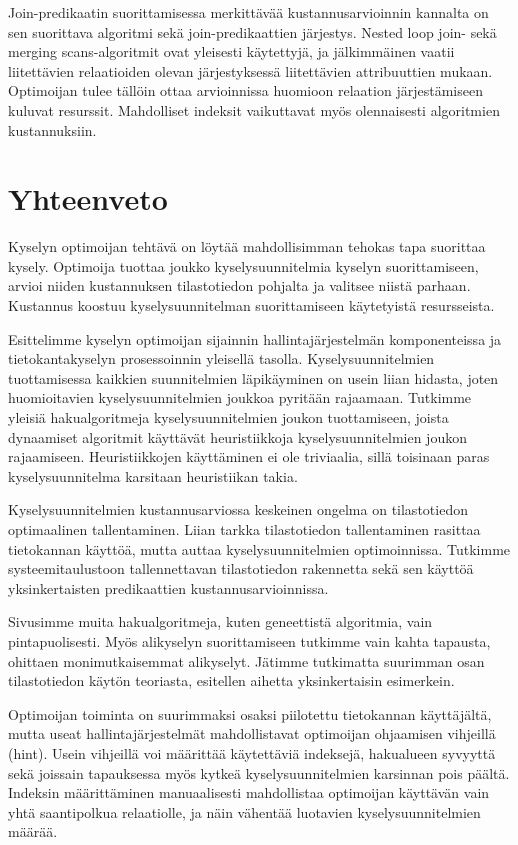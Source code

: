 \documentclass[finnish]{tktltiki2}
\theoremstyle{definition}
\theoremstyle{remark}
\begin{document}
Join-predikaatin suorittamisessa merkittävää kustannusarvioinnin kannalta on sen suorittava algoritmi sekä join-predikaattien järjestys. Nested loop join- sekä merging scans-algoritmit ovat yleisesti käytettyjä, ja jälkimmäinen vaatii liitettävien relaatioiden olevan järjestyksessä liitettävien attribuuttien mukaan. Optimoijan tulee tällöin ottaa arvioinnissa huomioon relaation järjestämiseen kuluvat resurssit. Mahdolliset indeksit vaikuttavat myös olennaisesti algoritmien kustannuksiin. 
\section{Yhteenveto}
Kyselyn optimoijan tehtävä on löytää mahdollisimman tehokas tapa suorittaa kysely. Optimoija tuottaa joukko kyselysuunnitelmia kyselyn suorittamiseen, arvioi niiden kustannuksen tilastotiedon pohjalta ja valitsee niistä parhaan. Kustannus koostuu kyselysuunnitelman suorittamiseen käytetyistä resursseista. 

Esittelimme kyselyn optimoijan sijainnin hallintajärjestelmän komponenteissa ja tietokantakyselyn prosessoinnin yleisellä tasolla. Kyselysuunnitelmien tuottamisessa kaikkien suunnitelmien läpikäyminen on usein liian hidasta, joten huomioitavien kyselysuunnitelmien joukkoa pyritään rajaamaan. Tutkimme yleisiä hakualgoritmeja kyselysuunnitelmien joukon tuottamiseen, joista dynaamiset algoritmit käyttävät heuristiikkoja kyselysuunnitelmien joukon rajaamiseen. Heuristiikkojen käyttäminen ei ole triviaalia, sillä toisinaan paras kyselysuunnitelma karsitaan heuristiikan takia. 

Kyselysuunnitelmien kustannusarviossa keskeinen ongelma on tilastotiedon optimaalinen tallentaminen. Liian tarkka tilastotiedon tallentaminen rasittaa tietokannan käyttöä, mutta auttaa kyselysuunnitelmien optimoinnissa. Tutkimme systeemitaulustoon tallennettavan tilastotiedon rakennetta sekä sen käyttöä yksinkertaisten predikaattien kustannusarvioinnissa.

Sivusimme muita hakualgoritmeja, kuten geneettistä algoritmia, vain pintapuolisesti. Myös alikyselyn suorittamiseen tutkimme vain kahta tapausta, ohittaen monimutkaisemmat alikyselyt. Jätimme tutkimatta suurimman osan tilastotiedon käytön teoriasta, esitellen aihetta yksinkertaisin esimerkein. 


Optimoijan toiminta on suurimmaksi osaksi piilotettu tietokannan käyttäjältä, mutta useat hallintajärjestelmät mahdollistavat optimoijan ohjaamisen vihjeillä (hint). Usein vihjeillä voi määrittää käytettäviä indeksejä, hakualueen syvyyttä sekä joissain %
tapauksessa myös kytkeä kyselysuunnitelmien karsinnan pois päältä. Indeksin määrittäminen manuaalisesti mahdollistaa optimoijan käyttävän vain yhtä saantipolkua relaatiolle, ja näin vähentää luotavien kyselysuunnitelmien määrää. %
\end{document}
